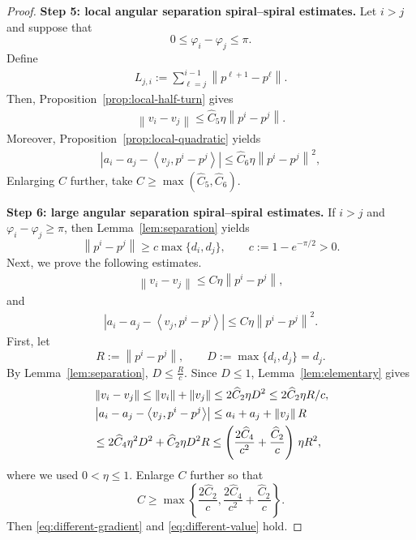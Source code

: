 \documentclass[11pt]{article}
\numberwithin{equation}{section}
\newcommand{\ip}[2]{\left\langle #1,#2\right\rangle}
\newcommand{\norm}[1]{\left\lVert #1\right\rVert}
\begin{document}
\begin{proof}
\medskip\noindent
\textbf{Step 5: local angular separation spiral--spiral estimates.}
Let $i>j$ and suppose that
\[
0\le \varphi_i-\varphi_j\le \pi.
\]
Define
\begin{eqnarray}\label{Lij}
L_{j,i}:=\sum_{\ell=j}^{i-1}\norm{p^{\ell+1}-p^\ell}.
\end{eqnarray}
Then, Proposition~\ref{prop:local-half-turn} gives
\begin{eqnarray}\label{add1}
\norm{v_i-v_j}\le \widehat C_5\eta\norm{p^i-p^j}.
\end{eqnarray}
Moreover, Proposition~\ref{prop:local-quadratic} yields
\begin{eqnarray}\label{add2}
\left|a_i-a_j-\ip{v_j}{p^i-p^j}\right|
\le
\widehat C_6\eta\norm{p^i-p^j}^2,
\end{eqnarray}
Enlarging $C$ further, take
$C\ge \max(\widehat C_5,\widehat C_6)$.


\medskip\noindent
\textbf{Step 6: large angular separation spiral--spiral estimates.}
If $i>j$ and $\varphi_i-\varphi_j\ge\pi$, then
Lemma~\ref{lem:separation} yields
\[
\norm{p^i-p^j}
\ge
c\max\{d_i,d_j\},
\qquad
c:=1-e^{-\pi/2}>0.
\]
Next, we prove the following estimates.
\begin{eqnarray}\label{eq:different-gradient}
\norm{v_i-v_j}
\le
C\eta\norm{p^i-p^j},
\end{eqnarray}
and
\begin{eqnarray}\label{eq:different-value}
\left|a_i-a_j-\ip{v_j}{p^i-p^j}\right|
\le
C\eta\norm{p^i-p^j}^2.
\end{eqnarray}
First, let
\[
R:=\norm{p^i-p^j},
\qquad
D:=\max\{d_i,d_j\}=d_j.
\]
By Lemma~\ref{lem:separation},
$D\le \frac{R}{c}.$
Since $D\le1$, Lemma~\ref{lem:elementary} gives
\begin{align*}
&\norm{v_i-v_j}
\le
\norm{v_i}+\norm{v_j}
\le
2{\widehat C_2}\eta D^2
\le
2{\widehat C_2}\eta R/c,
\\
&\left|a_i-a_j-\ip{v_j}{p^i-p^j}\right|
\le
a_i+a_j+\norm{v_j}R
\notag\\
&\le
2\widehat C_4\eta^2D^2+\widehat C_2\eta D^2R
\notag\le
\left(\frac{2\widehat C_4}{c^2}+\frac{\widehat C_2}{c}\right)\,\eta R^2,
\end{align*}
where we used \(0<\eta\leq1\). Enlarge $C$ further so that
\[
    C\geq
    \max\left\{
        \frac{2\widehat C_2}{c},
        \frac{2\widehat C_4}{c^2}
        +\frac{\widehat C_2}{c}
    \right\}.
\]
Then \eqref{eq:different-gradient} and \eqref{eq:different-value} hold.



\end{proof}
\end{document}
